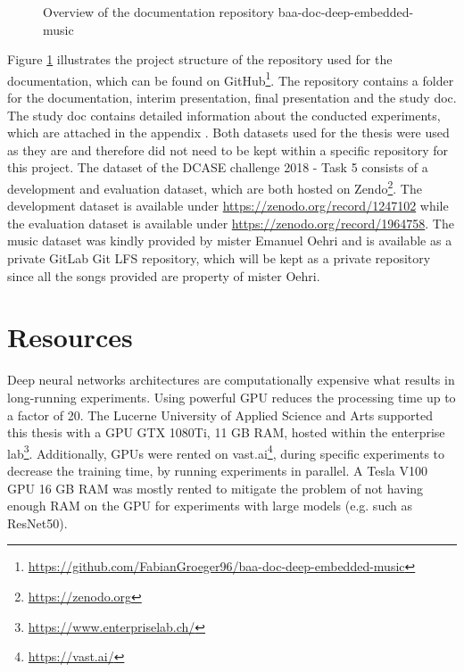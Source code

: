 \begin{figure}[ht]
\caption{Overview of the documentation repository \flqq baa-doc-deep-embedded-music\frqq}
\label{fig:Project-Overview-Documentation}
\end{figure}
\noindent
Figure \ref{fig:Project-Overview-Documentation} illustrates the project structure of the repository used for the documentation, which can be found on GitHub\footnote{\url{https://github.com/FabianGroeger96/baa-doc-deep-embedded-music}}. The repository contains a folder for the documentation, interim presentation, final presentation and the study doc. The study doc contains detailed information about the conducted experiments, which are attached in the appendix .
\newline
\newline
Both datasets used for the thesis were used as they are and therefore did not need to be kept within a specific repository for this project. The dataset of the DCASE challenge 2018 - Task 5 consists of a development and evaluation dataset, which are both hosted on Zendo\footnote{\url{https://zenodo.org}}. The development dataset is available under \url{https://zenodo.org/record/1247102} while the evaluation dataset is available under \url{https://zenodo.org/record/1964758}. 
\newline
\newline
The music dataset was kindly provided by mister Emanuel Oehri and is available as a private GitLab Git LFS repository, which will be kept as a private repository since all the songs provided are property of mister Oehri.

\section{Resources}
\label{sec:Resources}
Deep neural networks architectures are computationally expensive what results in long-running experiments. Using powerful \gls{GPU} reduces the processing time up to a factor of 20. The Lucerne University of Applied Science and Arts supported this thesis with a GPU GTX 1080Ti, 11 GB RAM, hosted within the enterprise lab\footnote{\url{https://www.enterpriselab.ch/}}. 
\newline
\newline
Additionally, \gls{GPU}s were rented on vast.ai\footnote{\url{https://vast.ai/}}, during specific experiments to decrease the training time, by running experiments in parallel. A Tesla V100 \gls{GPU} 16 GB RAM was mostly rented to mitigate the problem of not having enough RAM on the GPU for experiments with large models (e.g. such as ResNet50).

